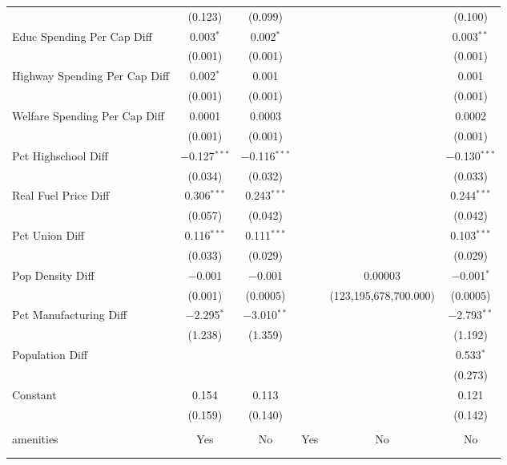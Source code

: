 \begin{table}[!htbp]
\begin{tabular}{@{\extracolsep{5pt}}lccccc}
  & (0.123) & (0.099) &  &  & (0.100) \\ 
  Educ Spending Per Cap Diff & 0.003$^{*}$ & 0.002$^{*}$ &  &  & 0.003$^{**}$ \\ 
  & (0.001) & (0.001) &  &  & (0.001) \\ 
  Highway Spending Per Cap Diff & 0.002$^{*}$ & 0.001 &  &  & 0.001 \\ 
  & (0.001) & (0.001) &  &  & (0.001) \\ 
  Welfare Spending Per Cap Diff & 0.0001 & 0.0003 &  &  & 0.0002 \\ 
  & (0.001) & (0.001) &  &  & (0.001) \\ 
  Pct Highschool Diff & $-$0.127$^{***}$ & $-$0.116$^{***}$ &  &  & $-$0.130$^{***}$ \\ 
  & (0.034) & (0.032) &  &  & (0.033) \\ 
  Real Fuel Price Diff & 0.306$^{***}$ & 0.243$^{***}$ &  &  & 0.244$^{***}$ \\ 
  & (0.057) & (0.042) &  &  & (0.042) \\ 
  Pct Union Diff & 0.116$^{***}$ & 0.111$^{***}$ &  &  & 0.103$^{***}$ \\ 
  & (0.033) & (0.029) &  &  & (0.029) \\ 
  Pop Density Diff & $-$0.001 & $-$0.001 &  & 0.00003 & $-$0.001$^{*}$ \\ 
  & (0.001) & (0.0005) &  & (123,195,678,700.000) & (0.0005) \\ 
  Pct Manufacturing Diff & $-$2.295$^{*}$ & $-$3.010$^{**}$ &  &  & $-$2.793$^{**}$ \\ 
  & (1.238) & (1.359) &  &  & (1.192) \\ 
  Population Diff &  &  &  &  & 0.533$^{*}$ \\ 
  &  &  &  &  & (0.273) \\ 
  Constant & 0.154 & 0.113 &  &  & 0.121 \\ 
  & (0.159) & (0.140) &  &  & (0.142) \\ 
 \hline \\[-1.8ex] 
amenities & Yes & No & Yes & No & No \\ 
\hline \\[-1.8ex] 
\hline 
\hline \\[-1.8ex] 
\end{tabular} 
\end{table} 
